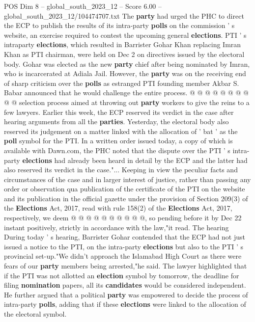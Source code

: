\begin{textsample}{POS Dim 8 – global\_south\_2023\_12 – Score 6.00 – global\_south\_2023\_12/104474707.txt}
The \textbf{party} had urged the PHC to direct the ECP to publish the results of its intra-party \textbf{polls} on the commission ' s website, an exercise required to contest the upcoming general \textbf{elections}.
PTI ' s intraparty \textbf{elections}, which resulted in Barrister Gohar Khan replacing Imran Khan as PTI chairman, were held on Dec 2 on directives issued by the electoral body.
Gohar was elected as the new \textbf{party} chief after being nominated by Imran, who is incarcerated at Adiala Jail.
However, the \textbf{party} was on the receiving end of sharp criticism over the \textbf{polls} as estranged PTI founding member Akbar S.
Babar announced that he would challenge the entire process. @ @ @ @ @ @ @ @ @ @ selection process aimed at throwing out \textbf{party} workers to give the reins to a few lawyers.
Earlier this week, the ECP reserved its verdict in the case after hearing arguments from all the \textbf{parties}.
Yesterday, the electoral body also reserved its judgement on a matter linked with the allocation of ' bat ' as the \textbf{poll} symbol for the PTI.
In a written order issued today, a copy of which is available with Dawn.com, the PHC noted that the dispute over the PTI ' s intra-party \textbf{elections} had already been heard in detail by the ECP and the latter had also reserved its verdict in the case."...
Keeping in view the peculiar facts and circumstances of the case and in larger interest of justice, rather than passing any order or observation qua publication of the certificate of the PTI on the website and its publication in the official gazette under the provision of Section 209(3) of the \textbf{Elections} Act, 2017, read with rule 158(2) of the \textbf{Elections} Act, 2017, respectively, we deem @ @ @ @ @ @ @ @ @ @, so pending before it by Dec 22 instant positively, strictly in accordance with the law,"it read.
The hearing During today ' s hearing, Barrister Gohar contended that the ECP had not just issued a notice to the PTI, on the intra-party \textbf{elections} but also to the PTI ' s provincial set-up."We didn't approach the Islamabad High Court as there were fears of our \textbf{party} members being arrested,"he said.
The lawyer highlighted that if the PTI was not allotted an \textbf{election} symbol by tomorrow, the deadline for filing \textbf{nomination} papers, all its \textbf{candidates} would be considered independent.
He further argued that a political \textbf{party} was empowered to decide the process of intra-party \textbf{polls}, adding that if these \textbf{elections} were linked to the allocation of the electoral symbol.

\end{textsample}
